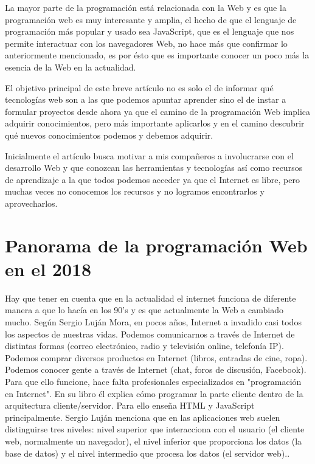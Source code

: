 \documentclass[twocolumns,a4paper]{IEEEtran}
\begin{document}
La mayor parte de la programación está relacionada con la Web y es que la
programación web es muy interesante y amplia, el hecho de que el lenguaje de
programación más popular y usado sea JavaScript, que es el lenguaje que nos
permite interactuar con los navegadores Web, no hace más que confirmar lo
anteriormente mencionado, es por ésto que es importante conocer un poco más la
esencia de la Web en la actualidad. 


El objetivo principal de este breve artículo no es solo el de informar qué
tecnologías web son a las que podemos apuntar aprender sino el de instar a
formular proyectos desde ahora ya que el camino de la programación Web implica
adquirir conocimientos, pero más importante aplicarlos y en el camino descubrir
qué nuevos conocimientos podemos y debemos adquirir.

Inicialmente el artículo busca motivar a mis compañeros a involucrarse con el
desarrollo Web y que conozcan las herramientas y tecnologías así como recursos
de aprendizaje a la que todos podemos acceder ya que el Internet es libre, pero
muchas veces no conocemos los recursos y no logramos encontrarlos y
aprovecharlos.

\section{Panorama de la programación Web en el 2018}

Hay que tener en cuenta que en la actualidad el internet funciona de
diferente manera a que lo hacía en los 90's y es que actualmente la Web a
cambiado mucho. Según Sergio Luján Mora, en pocos años, Internet a invadido
casi todos los aspectos de nuestras vidas. Podemos comunicarnos a través de
Internet de distintas formas (correo electrónico, radio y televisión online,
telefonía IP). Podemos comprar diversos productos en Internet (libros,
entradas de cine, ropa). Podemos conocer gente a través de Internet (chat,
foros de discusión, Facebook). Para que ello funcione, hace falta profesionales
especializados en "programación en Internet". En su libro él explica cómo
programar la parte cliente dentro de la arquitectura cliente/servidor. Para
ello enseña HTML y JavaScript principalmente. Sergio Luján menciona que en las
aplicaciones web suelen distinguirse tres niveles: nivel superior que
interacciona con el usuario (el cliente web, normalmente un navegador), el
nivel inferior que proporciona los datos (la base de datos) y el nivel
intermedio que procesa los datos (el servidor web).\cite{SergioLujan2001}.
\newline
\end{document}

